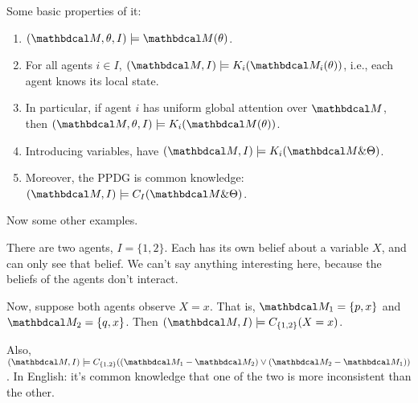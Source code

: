 Some basic properties of it:
\begin{prop}
    \begin{enumerate}[parsep=0pt]
    \item $ (\dg M, \theta, I) \models \dg M(\theta)$.
    \item For all agents $i \in I$, 
        $(\dg M, I) \models K_i ( \dg M_i(\theta) )$, i.e., each agent
            knows its local state. 
    \item In particular, if agent $i$ has uniform global attention over $\dg M$, then 
        $(\dg M, \theta, I) \models K_i (\dg M(\theta))$.
    \item Introducing variables,  have $(\dg M, I) \models K_i (\dg M \& \Theta)$.
    \item Moreover, the PPDG is common knowledge: $(\dg M, I) \models C_{I} (\dg M \& \Theta)$.
    \end{enumerate}
\end{prop}


Now some other examples. 

\begin{example}
    There are two agents, $I = \{1,2\}$. Each has its own belief
    about a variable $X$, and can only see that belief. 
    We can't say anything interesting here, because the beliefs
    of the agents don't interact.
    
    Now, suppose both agents observe $X=x$. That is, $\dg M_1 = \{p, x\}$
    and $\dg M_2 = \{q, x\}$. Then  $(\dg M, I) \models C_{\{1,2\}}(X=x)$. 
    
    Also, $(\dg M, I) \models C_{\{1,2\}}( (\dg M_1 - \dg M_2) \lor (\dg M_2 -\dg M_1))$.
    In English: it's common knowledge that one of the two is more inconsistent than the other.
\end{example}

